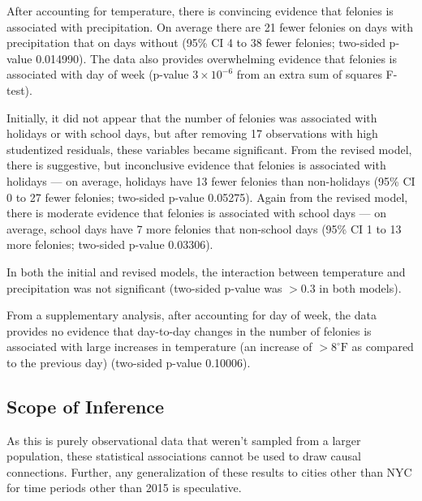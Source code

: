 \documentclass[11pt,notitlepage]{article}
\newcommand{\degf}{^\circ\text{F}}
\begin{document}
After accounting for temperature, there is convincing evidence that felonies is associated with precipitation. On average there are 21 fewer felonies on days with precipitation that on days without (95\% CI 4 to 38 fewer felonies; two-sided p-value 0.014990). The data also provides overwhelming evidence that felonies is associated with day of week (p-value $3 \times 10^{-6}$ from an extra sum of squares F-test).

Initially, it did not appear that the number of felonies was associated with holidays or with school days, but after removing 17 observations with high studentized residuals, these variables became significant. From the revised model, there is suggestive, but inconclusive evidence that felonies is associated with holidays --- on average, holidays have 13 fewer felonies than non-holidays (95\% CI 0 to 27 fewer felonies; two-sided p-value 0.05275). Again from the revised model, there is moderate evidence that felonies is associated with school days --- on average, school days have 7 more felonies that non-school days (95\% CI 1 to 13 more felonies; two-sided p-value 0.03306).

In both the initial and revised models, the interaction between temperature and precipitation was not significant (two-sided p-value was $>0.3$ in both models).


From a supplementary analysis, after accounting for day of week, the data provides no evidence that day-to-day changes in the number of felonies is associated with large increases in temperature (an increase of $>8 \degf$ as compared to the previous day) (two-sided p-value 0.10006).


\subsection{Scope of Inference}

As this is purely observational data that weren't sampled from a larger population, these statistical associations cannot be used to draw causal connections. Further, any generalization of these results to cities other than NYC for time periods other than 2015 is speculative.



\listoftodos

\pagebreak

%
%
\end{document}
